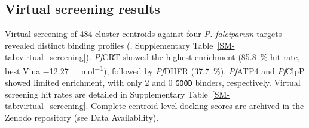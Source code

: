 \documentclass[journal=jcisd8,manuscript=article]{achemso}
\begin{document}
\begin{table}[htbp]
\centering
\caption{Enrichment validation against the MMV Malaria Box positive-control benchmark (confirmed antimalarial actives vs decoys), reported per target. Values in parentheses represent \qty{95}{\percent} bootstrap confidence intervals (\num{1000} resamples). N = number of MMV actives in the target subset. ROC-AUC = receiver operating characteristic area under the curve. EF\qty{5}{\percent} and EF\qty{10}{\percent} = enrichment factors at \qty{5}{\percent} and \qty{10}{\percent} of database. BEDROC = Boltzmann-Enhanced Discrimination of ROC ($\alpha=\num{20}$).}
\label{tab:enrichment_validation}
%
\end{table}


\subsection{Virtual screening results}
\label{sec:mpo}

Virtual screening of \num{484} cluster centroids against four \textit{P. falciparum} targets revealed distinct binding profiles (, Supplementary Table~\ref{SM-tab:virtual_screening}). \textit{Pf}CRT showed the highest enrichment (\qty{85.8}{\percent} hit rate, best Vina \qty{-12.27}{\kilo\calorie\per\mole}), followed by \textit{Pf}DHFR (\qty{37.7}{\percent}). \textit{Pf}ATP4 and \textit{Pf}ClpP showed limited enrichment, with only \num{2} and \num{0} \texttt{GOOD} binders, respectively. Virtual screening hit rates are detailed in Supplementary Table~\ref{SM-tab:virtual_screening}. Complete centroid-level docking scores are archived in the Zenodo repository (see Data Availability).
\end{document}
